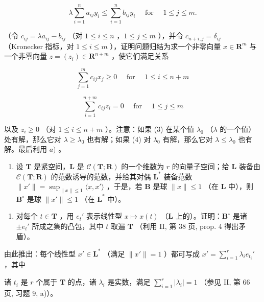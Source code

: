 \[
\lambda \sum_ {i = 1} ^ {n} a _ {i j} y _ {i} \leqslant \sum_ {i = 1} ^ {n} b _ {i j} y _ {i} \quad \text { for } \quad 1 \leqslant j \leqslant m\tag{2}.
\]

（令 \(c_{ij} = \lambda a_{ij} - b_{ij}\) （对 \(1 \leqslant i \leqslant n\) ，\(1 \leqslant j \leqslant m\) ），并令 \(c_{n + i,j} = \delta_{ij}\) （Kronecker 指标，对 \(1 \leqslant i \leqslant m\) ），证明问题归结为求一个非零向量 \(x \in \mathbf{R}^m\) 与一个非零向量 \(z = (z_i) \in \mathbf{R}^{n + m}\) ，使它们满足关系

\[
\sum_ {j = 1} ^ {m} c _ {i j} x _ {j} \geqslant 0 \quad \text { for } \quad 1 \leqslant i \leqslant n + m\tag{3}
\]

\[
\sum_ {i = 1} ^ {n + m} c _ {i j} z _ {i} = 0 \quad \text { for } \quad 1 \leqslant j \leqslant m\tag{4}
\]

以及 \(z_{i} \geqslant 0\) （对 \(1 \leqslant i \leqslant n + m\) ）。注意：如果 (3) 在某个值 \(\lambda_0\) （\(\lambda\) 的一个值）处有解，那么它对 \(\lambda \geqslant \lambda_0\) 也有解；如果 (4) 对 \(\lambda_0\) 有解，那么它对 \(\lambda \leqslant \lambda_0\) 也有解。最后利用 \(a)\) 。

\begin{enumerate}
\def\labelenumi{\arabic{enumi})}
\setcounter{enumi}{7}
\tightlist
\item
  设 \(\mathbf{T}\) 是紧空间，\(\mathbf{L}\) 是 \(\mathcal{C}(\mathbf{T};\mathbf{R})\) 的一个维数为 \(r\) 的向量子空间；给 \(\mathbf{L}\) 装备由 \(\mathcal{C}(\mathbf{T};\mathbf{R})\) 的范数诱导的范数，并给其对偶 \(\mathbf{L}^*\) 装备范数 \(\| x'\| = \sup_{\| x\| \leqslant 1} \langle x, x' \rangle\) ，于是，若 \(\mathbf{B}\) 是球 \(\| x\| \leqslant 1\) （在 \(\mathbf{L}\) 中），则 \(\mathbf{B}^\circ\) 是球 \(\| x'\| \leqslant 1\) （在 \(\mathbf{L}^*\) 中）。
\end{enumerate}

\begin{enumerate}
\def\labelenumi{\alph{enumi})}
\tightlist
\item
  对每个 \(t \in \mathbf{T}\) ，用 \(e_t'\) 表示线性型 \(x \mapsto x(t)\) （\(\mathbf{L}\) 上的）。证明：\(\mathbf{B}^\circ\) 是诸 \(\pm e_t'\) 所成之集的凸包，其中 \(t\) 取遍 \(\mathbf{T}\) （利用 II, 第 38 页, prop. 4 得出矛盾）。
\end{enumerate}

由此推出：每个线性型 \(x' \in \mathbf{L}^*\) （满足 \(\| x' \| = 1\) ）都可写成 \(x' = \sum_{i=1}^{r} \lambda_i e_{t_i}'\) ，其中

诸 \(t_i\) 是 \(r\) 个属于 \(\mathbf{T}\) 的点，诸 \(\lambda_i\) 是实数，满足 \(\sum_{i=1}^{r} |\lambda_i| = 1\) （参见 II, 第 66 页, 习题 9, a)）。

